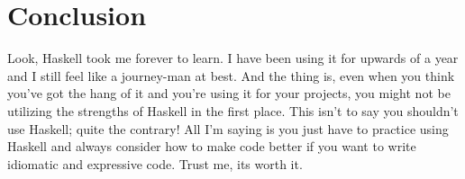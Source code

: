 \documentclass[12pt]{article}
\begin{document}
  \section{Conclusion}

  Look, Haskell took me forever to learn. I have been using it for upwards of a year and I still feel like a journey-man at best. And the thing is, even when you think you've got the hang of it and you're using it for your projects, you might not be utilizing the strengths of Haskell in the first place. This isn't to say you shouldn't use Haskell; quite the contrary! All I'm saying is you just have to practice using Haskell and always consider how to make code better if you want to write idiomatic and expressive code. Trust me, its worth it.
\end{document}
